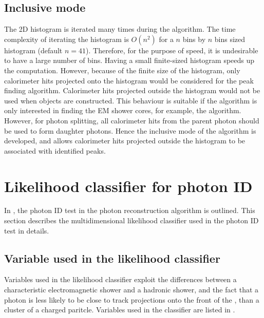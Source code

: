 \subsection{Inclusive mode}
\label{sec:photonPeakFindingInclusive}

The 2D histogram is iterated many times during the algorithm. The time complexity of iterating the histogram is $O(n^2)$ for a $n$ bins by  $n$ bins sized histogram (default $n = 41$). Therefore, for the purpose of speed, it is undesirable to have  a large number of bins. Having a small finite-sized histogram speeds up the computation. However, because of the finite size of the histogram, only  calorimeter hits  projected onto the histogram would be considered for the peak finding algorithm. Calorimeter hits projected outside the histogram would not be used when \ShowerPeak objects are constructed. This behaviour is suitable if the algorithm is only interested in finding the EM shower cores, for example, the \PhotonReconstruction algorithm. However, for photon splitting, all calorimeter hits from the parent photon should be used to form daughter photons. Hence the inclusive mode of the \peakFinding algorithm is developed, and allows calorimeter hits projected outside the histogram to be associated with identified peaks.


\section{Likelihood classifier for photon ID}
\label{sec:photonLikelihood}

In , the photon ID test in the photon reconstruction algorithm is outlined. This section describes the multidimensional likelihood classifier used in the photon ID test in details.


\subsection{Variable used in the likelihood classifier}

Variables used in the likelihood classifier exploit the differences between a characteristic electromagnetic shower and a hadronic shower, and the fact that a photon is less likely to be close to track projections onto the front of the \ECAL, than a cluster of a charged paritcle. Variables used in the classifier are listed in .

